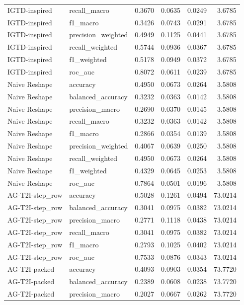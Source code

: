 \begin{tabular}{llrrrr}
IGTD-inspired & recall_macro & 0.3670 & 0.0635 & 0.0249 & 3.6785 \\
IGTD-inspired & f1_macro & 0.3426 & 0.0743 & 0.0291 & 3.6785 \\
IGTD-inspired & precision_weighted & 0.4949 & 0.1125 & 0.0441 & 3.6785 \\
IGTD-inspired & recall_weighted & 0.5744 & 0.0936 & 0.0367 & 3.6785 \\
IGTD-inspired & f1_weighted & 0.5178 & 0.0949 & 0.0372 & 3.6785 \\
IGTD-inspired & roc_auc & 0.8072 & 0.0611 & 0.0239 & 3.6785 \\
Naive Reshape & accuracy & 0.4950 & 0.0673 & 0.0264 & 3.5808 \\
Naive Reshape & balanced_accuracy & 0.3232 & 0.0363 & 0.0142 & 3.5808 \\
Naive Reshape & precision_macro & 0.2690 & 0.0370 & 0.0145 & 3.5808 \\
Naive Reshape & recall_macro & 0.3232 & 0.0363 & 0.0142 & 3.5808 \\
Naive Reshape & f1_macro & 0.2866 & 0.0354 & 0.0139 & 3.5808 \\
Naive Reshape & precision_weighted & 0.4067 & 0.0639 & 0.0250 & 3.5808 \\
Naive Reshape & recall_weighted & 0.4950 & 0.0673 & 0.0264 & 3.5808 \\
Naive Reshape & f1_weighted & 0.4329 & 0.0645 & 0.0253 & 3.5808 \\
Naive Reshape & roc_auc & 0.7864 & 0.0501 & 0.0196 & 3.5808 \\
AG-T2I-step_row & accuracy & 0.5028 & 0.1261 & 0.0494 & 73.0214 \\
AG-T2I-step_row & balanced_accuracy & 0.3041 & 0.0975 & 0.0382 & 73.0214 \\
AG-T2I-step_row & precision_macro & 0.2771 & 0.1118 & 0.0438 & 73.0214 \\
AG-T2I-step_row & recall_macro & 0.3041 & 0.0975 & 0.0382 & 73.0214 \\
AG-T2I-step_row & f1_macro & 0.2793 & 0.1025 & 0.0402 & 73.0214 \\
AG-T2I-step_row & roc_auc & 0.7533 & 0.0876 & 0.0343 & 73.0214 \\
AG-T2I-packed & accuracy & 0.4093 & 0.0903 & 0.0354 & 73.7720 \\
AG-T2I-packed & balanced_accuracy & 0.2389 & 0.0608 & 0.0238 & 73.7720 \\
AG-T2I-packed & precision_macro & 0.2027 & 0.0667 & 0.0262 & 73.7720 \\

\end{tabular}
